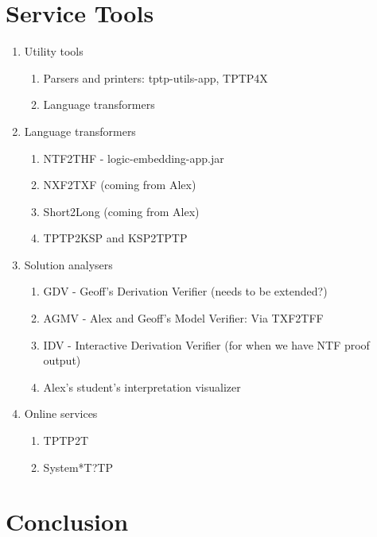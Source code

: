 \documentclass[runningheads]{llncs}
\begin{document}
\section{Service Tools}
\label{ServiceTools}

\begin{enumerate}
\item Utility tools
      \begin{enumerate}
      \item Parsers and printers: tptp-utils-app, TPTP4X
      \item Language transformers
      \end{enumerate}

\item Language transformers
      \begin{enumerate}
      \item NTF2THF - logic-embedding-app.jar
      \item NXF2TXF (coming from Alex)
      \item Short2Long (coming from Alex)
      \item TPTP2KSP and KSP2TPTP
      \end{enumerate}

\item Solution analysers
      \begin{enumerate}
      \item GDV - Geoff's Derivation Verifier (needs to be extended?)
      \item AGMV - Alex and Geoff's Model Verifier: Via TXF2TFF
      \item IDV - Interactive Derivation Verifier (for when we have NTF proof output)
      \item Alex's student's interpretation visualizer
      \end{enumerate}

\item Online services
      \begin{enumerate}
      \item TPTP2T
      \item System*T?TP
      \end{enumerate}

\end{enumerate}

\section{Conclusion}
\label{Conclusion}



\end{document}
